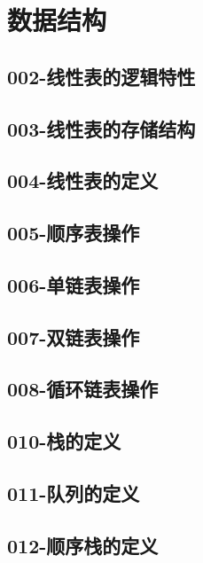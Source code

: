 
\section{数据结构}
\subsection{002-线性表的逻辑特性}

\subsection{003-线性表的存储结构}

\subsection{004-线性表的定义}

\subsection{005-顺序表操作}

\subsection{006-单链表操作}

\subsection{007-双链表操作}

\subsection{008-循环链表操作}

\subsection{010-栈的定义}

\subsection{011-队列的定义}

\subsection{012-顺序栈的定义}

